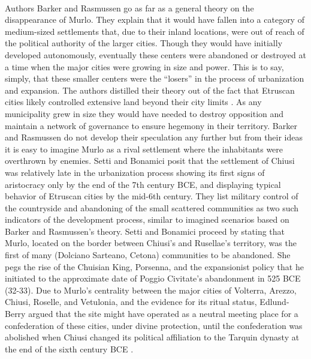 \documentclass[12pt,a4paper]{thesis}
\begin{document}
\paragraph{}
Authors Barker and Rasmussen go as far as a general theory on the disappearance of Murlo. They explain that it would have fallen into a category of medium-sized settlements that, due to their inland locations, were out of reach of the political authority of the larger cities. Though they would have initially developed autonomously, eventually these centers were abandoned or destroyed at a time when the major cities were growing in size and power. This is to say, simply, that these smaller centers were the ``losers'' in the process of urbanization and expansion. The authors distilled their theory out of the fact that Etruscan cities likely controlled extensive land beyond their city limits \cite[p. 100,176]{BarRas98}. As any municipality grew in size they would have needed to destroy opposition and maintain a network of governance to ensure hegemony in their territory. Barker and Rasmussen do not develop their speculation any further but from their ideas it is easy to imagine Murlo as a rival settlement where the inhabitants were overthrown by enemies. Setti and Bonamici \citeyearpar{SetBon85} posit that the settlement of Chiusi was relatively late in the urbanization process showing its first signs of aristocracy only by the end of the 7th century BCE, and displaying typical behavior of Etruscan cities by the mid-6th century. They list military control of the countryside and abandoning of the small scattered communities as two such indicators of the development process, similar to imagined scenarios based on Barker and Rasmussen's theory. Setti and Bonamici proceed by stating that Murlo, located on the border between Chiusi's and Rusellae's territory, was the first of many (Dolciano Sarteano, Cetona) communities to be abandoned. She pegs the rise of the Chuisian King, Porsenna, and the expansionist policy that he initiated to the approximate date of Poggio Civitate's abandonment in 525 BCE (32-33). Due to Murlo's centrality between the major cities of Volterra, Arezzo, Chiusi, Roselle, and Vetulonia, and the evidence for its ritual status, Edlund-Berry \citeyearpar{IEB94} argued that the site might have operated as a neutral meeting place for a confederation of these cities, under divine protection, until the confederation was abolished when Chiusi changed its political affiliation to the Tarquin dynasty at the end of the sixth century BCE \cite[p. 176-177]{BarRas98}.
\end{document}
